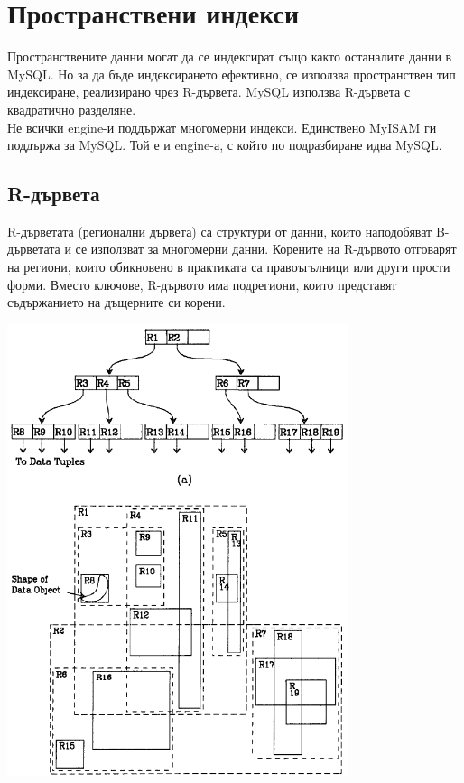 \documentclass[a4paper,10pt]{article}
\begin{document}
\section{Пространствени индекси}
Пространствените данни могат да се индексират също както останалите данни в MySQL. Но за да бъде 
индексирането ефективно, се използва пространствен тип индексиране, реализирано чрез R-дървета. 
MySQL използва R-дървета с квадратично разделяне. \\
Не всички engine-и поддържат многомерни индекси. Единствено MyISAM ги поддържа за MySQL. Той е и engine-а, с който 
по подразбиране идва MySQL.

\subsection{R-дървета}
R-дърветата (регионални дървета) са структури от данни, които наподобяват B-дърветата и се използват за многомерни данни.
Корените на R-дървото отговарят на региони, които обикновено в практиката са правоъгълници или други прости форми. 
Вместо ключове, R-дървото има подрегиони, които представят съдържанието на дъщерните си корени.
\begin{center}
\includegraphics[width=100mm]{rtree.png}\end{center}
\end{document}
